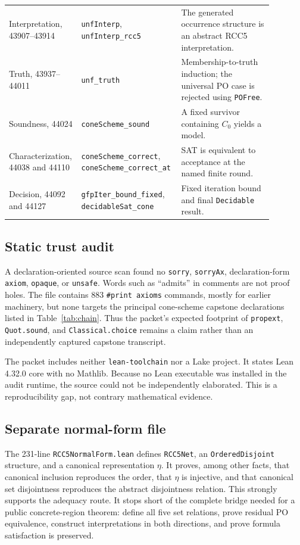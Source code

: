 \documentclass[11pt]{article}
\newcommand{\code}[1]{\texttt{#1}}
\begin{document}
\begin{longtable}{>{\raggedright\arraybackslash}p{0.18\linewidth}
                  >{\raggedright\arraybackslash}p{0.36\linewidth}
                  >{\raggedright\arraybackslash}p{0.34\linewidth}}
Interpretation, 43907--43914 & \code{unfInterp}, \code{unfInterp\_rcc5} & The
generated occurrence structure is an abstract RCC5 interpretation. \\
Truth, 43937--44011 & \code{unf\_truth} & Membership-to-truth induction; the
universal PO case is rejected using \code{POFree}. \\
Soundness, 44024 & \code{coneScheme\_sound} & A fixed survivor containing $C_0$
yields a model. \\
Characterization, 44038 and 44110 & \code{coneScheme\_correct},
\code{coneScheme\_correct\_at} & SAT is equivalent to acceptance at the named finite
round. \\
Decision, 44092 and 44127 & \code{gfpIter\_bound\_fixed},
\code{decidableSat\_cone} & Fixed iteration bound and final \code{Decidable} result. \\
\bottomrule
\end{longtable}

\subsection{Static trust audit}

A declaration-oriented source scan found no \code{sorry}, \code{sorryAx},
declaration-form \code{axiom}, \code{opaque}, or \code{unsafe}. Words such as
``admits'' in comments are not proof holes. The file contains 883
\code{\#print axioms} commands, mostly for earlier machinery, but none targets the
principal cone-scheme capstone declarations listed in Table~\ref{tab:chain}. Thus the
packet's expected footprint of \code{propext}, \code{Quot.sound}, and
\code{Classical.choice} remains a claim rather than an independently captured
capstone transcript.

The packet includes neither \code{lean-toolchain} nor a Lake project. It states Lean
4.32.0 core with no Mathlib. Because no Lean executable was installed in the audit
runtime, the source could not be independently elaborated. This is a reproducibility
gap, not contrary mathematical evidence.

\subsection{Separate normal-form file}

The 231-line \code{RCC5NormalForm.lean} defines \code{RCC5Net}, an
\code{OrderedDisjoint} structure, and a canonical representation $\eta$. It proves,
among other facts, that canonical inclusion reproduces the order, that $\eta$ is
injective, and that canonical set disjointness reproduces the abstract disjointness
relation. This strongly supports the adequacy route. It stops short of the complete
bridge needed for a public concrete-region theorem: define all five set relations,
prove residual PO equivalence, construct interpretations in both directions, and prove
formula satisfaction is preserved.
\end{document}

